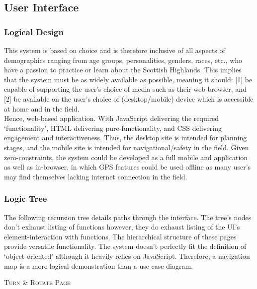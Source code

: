\documentclass[11pt, english]{article}
\begin{document}
	\subsection{User Interface}

		\subsubsection{Logical Design}

	This system is based on choice and is therefore inclusive of all aspects of demographics ranging from age groups, personalities, genders, races, etc., who have a passion to practice or learn about the Scottish Highlands. This implies that the system must be as widely available as possible, meaning it should: [1] be capable of supporting the user's choice of media such as their web browser, and [2] be available on the user's choice of (desktop/mobile) device which is accessible at home and in the field.\\

	Hence, web-based application. With JavaScript delivering the required `functionality', HTML delivering pure-functionality, and CSS delivering engagement and interactiveness. Thus, the desktop site is intended for planning stages, and the mobile site is intended for navigational/safety in the field. Given zero-constraints, the system could be developed as a full mobile and application as well as in-browser, in which GPS features could be used offline as many user's may find themselves lacking internet connection in the field.

		\subsubsection{Logic Tree}

	The following recursion tree details paths through the interface. The tree's nodes don't exhaust listing of functions however, they do exhaust listing of the UI's element-interaction with functions. The hierarchical structure of these pages provide versatile functionality. The system doesn't perfectly fit the definition of `object oriented' although it heavily relies on JavaScript. Therefore, a navigation map is a more logical demonstration than a use case diagram.

	\vspace{\fill}

	\begin{center}
		\textsc{Turn \& Rotate Page}
	\end{center}
\end{document}
